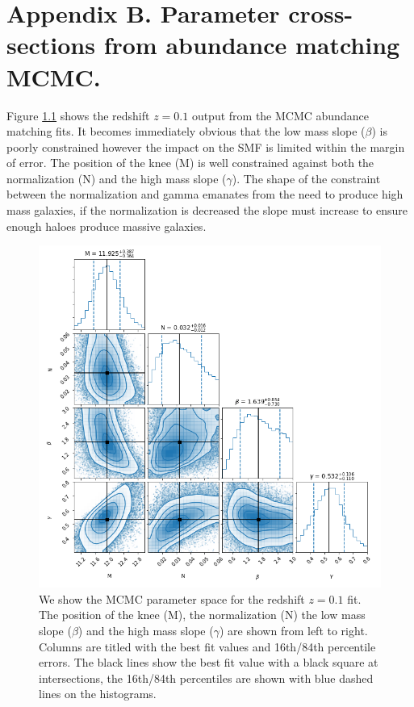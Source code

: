 \chapter{Appendix B. Parameter cross-sections from abundance matching MCMC.}

\label{Appx:AbnMCMC}

Figure \ref{fig:MCMC_lz} shows the redshift $z = 0.1$ output from the MCMC abundance matching fits. It becomes immediately obvious that the low mass slope ($\beta$) is poorly constrained however the impact on the SMF is limited within the margin of error. The position of the knee (M) is well constrained against both the normalization (N) and the high mass slope ($\gamma$). The shape of the constraint between the normalization and gamma emanates from the need to produce high mass galaxies, if the normalization is decreased the slope must increase to ensure enough haloes produce massive galaxies.

\begin{figure}
	\centering
	\includegraphics[width = \linewidth]{Appendices/AbnMCMC/MCMC_plot_lz.png}
    \caption{We show the MCMC parameter space for the redshift $z = 0.1$ fit. The position of the knee (M), the normalization (N) the low mass slope ($\beta$) and the high mass slope ($\gamma$) are shown from left to right. Columns are titled with the best fit values and 16th/84th percentile errors. The black lines show the best fit value with a black square at intersections, the 16th/84th percentiles are shown with blue dashed lines on the histograms.}
	\label{fig:MCMC_lz}
\end{figure}

